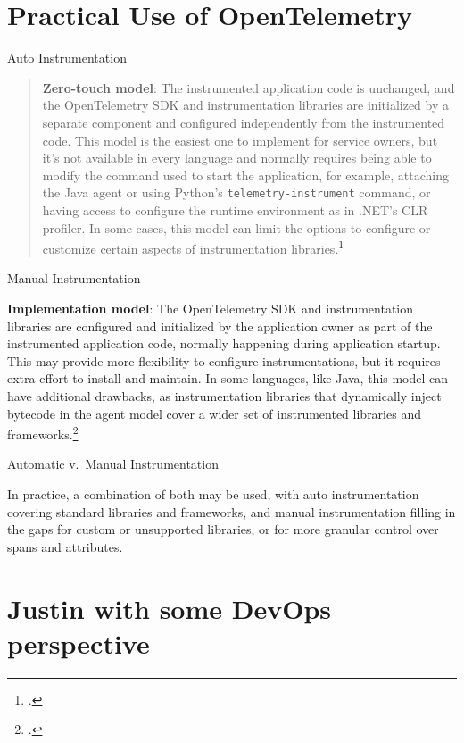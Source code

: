 \documentclass[aspectratio=169]{beamer}
\begin{document}
\section{Practical Use of OpenTelemetry}
\begin{frame}{Auto Instrumentation}

  \begin{quote}

    \textbf{Zero-touch model}: The instrumented application code is unchanged,
    and the OpenTelemetry SDK and instrumentation libraries are initialized by a
    separate component and configured independently from the instrumented code.
    This model is the easiest one to implement for service owners, but it's not
    available in every language and normally requires being able to modify the
    command used to start the application, for example, attaching the Java agent
    or using Python's \lstinline{telemetry-instrument} command, or having access
    to configure the runtime environment as in .NET's CLR profiler. In some
    cases, this model can limit the options to configure or customize certain
    aspects of instrumentation libraries.\footcite[ch.~4]{practical-otel}

  \end{quote}

\end{frame}

\begin{frame}{Manual Instrumentation}

  \textbf{Implementation model}: The OpenTelemetry SDK and instrumentation
  libraries are configured and initialized by the application owner as part of the
  instrumented application code, normally happening during application startup.
  This may provide more flexibility to configure instrumentations, but it requires
  extra effort to install and maintain. In some languages, like Java, this model
  can have additional drawbacks, as instrumentation libraries that dynamically
  inject bytecode in the agent model cover a wider set of instrumented libraries
  and frameworks.\footcite[ch.~4]{practical-otel}

\end{frame}

\begin{frame}{Automatic v.~Manual Instrumentation}

  In practice, a combination of both may be used, with auto instrumentation
  covering standard libraries and frameworks, and manual instrumentation filling
  in the gaps for custom or unsupported libraries, or for more granular control
  over spans and attributes.

\end{frame}

\section{Justin with some DevOps perspective}
\end{document}

